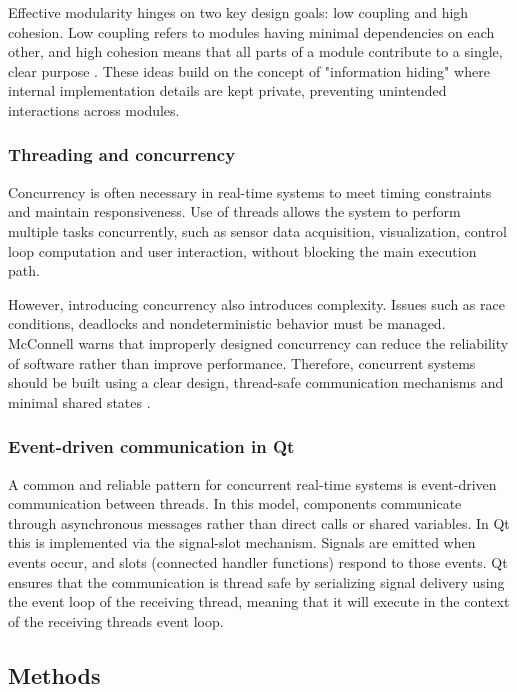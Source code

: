 Effective modularity hinges on two key design goals: low coupling and high cohesion. Low coupling refers to modules having minimal dependencies on each other, and high cohesion means that all parts of a module contribute to a single, clear purpose \cite{steve_mcconnell_code_nodate}. These ideas build on the concept of "information hiding" \cite{parnas_criteria_1972} where internal implementation details are kept private, preventing unintended interactions across modules.

\subsubsection{Threading and concurrency}
Concurrency is often necessary in real-time systems to meet timing constraints and maintain responsiveness. Use of threads allows the system to perform multiple tasks concurrently, such as sensor data acquisition, visualization, control loop computation and user interaction, without blocking the main execution path.

However, introducing concurrency also introduces complexity. Issues such as race conditions, deadlocks and nondeterministic behavior must be managed. McConnell \cite{mcconnell_code_2004} warns that improperly designed concurrency can reduce the reliability of software rather than improve performance. Therefore, concurrent systems should be built using a clear design, thread-safe communication mechanisms and minimal shared states \cite{noauthor_software_nodate}.

\subsubsection{Event-driven communication in Qt}
A common and reliable pattern for concurrent real-time systems is event-driven communication between threads. In this model, components communicate through asynchronous messages rather than direct calls or shared variables. In Qt this is implemented via the signal-slot mechanism. Signals are emitted when events occur, and slots (connected handler functions) respond to those events. Qt ensures that the communication is thread safe by serializing signal delivery using the event loop of the receiving thread, meaning that it will execute in the context of the receiving threads event loop. 

\subsection{Methods}

